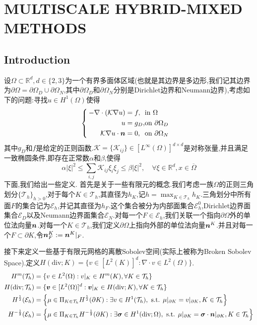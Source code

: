 \section{MULTISCALE HYBRID-MIXED METHODS}
\subsection{Introduction}
设$\Omega\subset \mathbb{R}^d,d\in\{2,3\}$为一个有界多面体区域(也就是其边界是多边形,我们记其边界为$\partial\Omega=\partial\Omega_D\cup \partial\Omega_N$,其中$\partial\Omega_D$和$\partial\Omega_N$分别是Dirichlet边界和Neumann边界),考虑如下的问题:寻找$u\in H^1(\Omega)$使得
\begin{equation}
        \begin{cases}
    \begin{alignedat}{2}
        -\nabla\cdot(\mathcal{K}\nabla u)&=f,&&\text{in }\Omega\\
        u&=g_D,&&\text{on }\partial\Omega_D\\
        \mathcal{K}\nabla u\cdot\bm{n}&=0,&&\text{on }\partial\Omega_N
    \end{alignedat}
        \end{cases}
        \label{eq:elliptic_equ}
\end{equation}
其中$g_D$和$f$是给定的正则函数.$\mathcal{K}=\{\mathcal{K}_{ij}\}\in [L^\infty(\Omega)]^{d\times d}$是对称张量,并且满足一致椭圆条件,即存在正常数$\alpha$和$\beta$,使得
$$
\alpha|\xi|^2\leqslant \sum_{i,j}\mathcal{K}_{ij}\xi_i\xi_j\leqslant \beta|\xi|^2,\quad \forall \xi\in\mathbb{R}^d,x\in \overline{\Omega}
$$
\qquad 下面,我们给出一些定义.
首先是关于一些有限元的概念.我们考虑一族$\Omega$的正则三角划分$\{\mathcal{T}_h\}_{h>0}$,对于每个$K\in\mathcal{T}_h$,其直径为$h_K$,记$h=\max_{K\in\mathcal{T}_h}h_K$.三角划分中所有面$F$的集合记为$\mathcal{E}_h$,并记其直径为$h_F$.这个集合被分为内部面集合$\mathcal{E}_h^0$,Dirichlet边界面集合$\mathcal{E}_D$以及Neumann边界面集合$\mathcal{E}_N$.对每一个$F\in \mathcal{E}_h$,我们关联一个指向$\partial\Omega$外的单位法向量$\bm{n}$.对每一个$K\in\mathcal{T}_h$,我们定义$\partial\Omega$上指向外部的单位法向量$\bm{n}^K$.并且对每一个$F\subset \partial K$,令$\bm{n}^K_F:=\bm{n}^K|_{F}$.\par
接下来定义一些基于有限元网格的离散Sobolev空间(实际上被称为Broken Sobolev Space).定义$H(\mathrm{div};K)=\{v\in [L^2(K)]^d:\nabla\cdot v\in L^2(\Omega)\}$.
$$
\begin{aligned}
H^m(\mathcal{T}_h) & =\{v\in L^2(\Omega):v|_K\in H^m(K),\forall K\in\mathcal{T}_h\}\\
H(\mathrm{div};\mathcal{T}_h) & =\{\bm{v}\in [L^2(\Omega)]^d:\bm{v}|_K\in H(\mathrm{div};K),\forall K\in\mathcal{T}_h\}\\
H^{\frac{1}{2}}(\mathcal{E}_h) &= \left\{\mu\in \Pi_{K\in\mathcal{T}_h}H^{\frac{1}{2}}(\partial K):\exists v\in H^1(\mathcal{T}_h),\text{ s.t. }\mu|_{\partial K}=v|_{\partial K},K\in \mathcal{T}_h\right\}\\
H^{-\frac{1}{2}}(\mathcal{E}_h) & =\left\{\mu\in \Pi_{K\in\mathcal{T}_h}H^{-\frac{1}{2}}(\partial K):\exists \bm{\sigma}\in H^1(\mathrm{div};\Omega),\text{ s.t. }\mu|_{\partial K}=\bm{\sigma}\cdot\bm{n}|_{\partial K},K\in \mathcal{T}_h\right\}
\end{aligned}
$$
